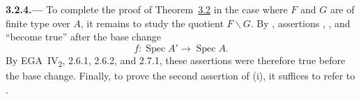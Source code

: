 
\medskip
{}\label{par:sga3-VIA-3.2.4}%
\noindent\textbf{3.2.4.---}
To complete the proof of Theorem~\hyperref[thm:sga3-VIA-3.2]{3.2} in the case where \(F\) and \(G\) are of finite type over \(A\),
it remains to study the quotient \(F\backslash G\). By
, assertions , , and  ``become true''
after the base change
\[
  f:\operatorname{Spec}A'\longrightarrow\operatorname{Spec}A.
\]
By EGA~IV\textsubscript{2}, 2.6.1, 2.6.2, and 2.7.1, these assertions
were therefore true before the base change. Finally, to prove the
second assertion of (i), it suffices to refer to .

